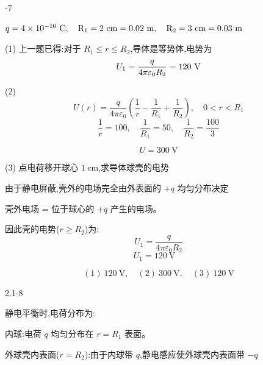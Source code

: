 \documentclass{article}
\begin{document}
-7 %





$q = 4\times 10^{-10} \ \rm{C}, \quad R_1 = 2\ \rm{cm} = 0.02\ \rm{m}, \quad R_2 = 3\ \rm{cm} = 0.03\ \rm{m}$


 (1)
上一题已得:对于 $ R_1 \le r \le R_2 $,导体是等势体,电势为
$$U_1 = \frac{q}{4\pi\varepsilon_0 R_2}= 120 \ \rm{V}$$

 (2) 
$$U(r) = \frac{q}{4\pi\varepsilon_0} \left( \frac{1}{r} - \frac{1}{R_1} + \frac{1}{R_2} \right), \quad 0 < r < R_1$$
$$\frac{1}{r} = 100, \quad \frac{1}{R_1} = 50, \quad \frac{1}{R_2}=\frac{100}{3}$$

$$U =300 \ \text{V}$$




 (3) 点电荷移开球心 $ 1\ \text{cm} $,求导体球壳的电势


由于静电屏蔽,壳外的电场完全由外表面的 $+q$ 均匀分布决定

壳外电场 = 位于球心的 $+q$ 产生的电场。  

因此壳的电势($ r \ge R_2 $)为:
$$U_1 = \frac{q}{4\pi\varepsilon_0 R_2}$$
$$U_1 = 120\ \text{V} \quad $$


$$
\boxed{(1)\ 120\ \text{V}, \quad (2)\ 300\ \text{V}, \quad (3)\ 120\ \text{V}}
$$






\newpage

2.1-8%









静电平衡时,电荷分布为:

内球:电荷 $ q $ 均匀分布在 $ r = R_1 $ 表面。  

外球壳内表面($ r = R_2 $):由于内球带 $ q $,静电感应使外球壳内表面带 $ -q $
\end{document}
